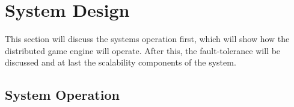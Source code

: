 \section{System Design}
This section will discuss the systems operation first, which will show how the distributed game engine will operate. After this, the fault-tolerance will be discussed and at last the scalability components of the system.

\subsection{System Operation}
